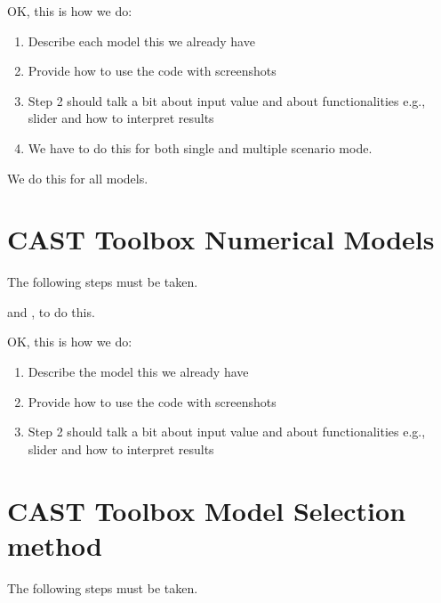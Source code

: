 \documentclass[letterpaper,10pt,english]{sphinxmanual}
\begin{document}
\sphinxAtStartPar
OK, this is how we do:
\begin{enumerate}
%
\item {} 
\sphinxAtStartPar
Describe each model \sphinxhyphen{} this we already have

\item {} 
\sphinxAtStartPar
Provide how to use the code with screenshots

\item {} 
\sphinxAtStartPar
Step 2 should talk a bit about input value and about functionalities \sphinxhyphen{} e.g., slider and how to interpret results

\item {} 
\sphinxAtStartPar
We have to do this for both single and multiple scenario mode.

\end{enumerate}

\sphinxAtStartPar
We do this for all models.


\chapter{CAST Toolbox \sphinxhyphen{} Numerical Models}
\label{\detokenize{contents/toolbox/num_model:cast-toolbox-numerical-models}}\label{\detokenize{contents/toolbox/num_model::doc}}
\sphinxAtStartPar
The following steps must be taken.

\sphinxAtStartPar
{} and , to do this.

\sphinxAtStartPar
OK, this is how we do:
\begin{enumerate}
%
\item {} 
\sphinxAtStartPar
Describe the model \sphinxhyphen{} this we already have

\item {} 
\sphinxAtStartPar
Provide how to use the code with screenshots

\item {} 
\sphinxAtStartPar
Step 2 should talk a bit about input value and about functionalities \sphinxhyphen{} e.g., slider and how to interpret results

\end{enumerate}


\chapter{CAST Toolbox \sphinxhyphen{} Model Selection method}
\label{\detokenize{contents/toolbox/mod_sel:cast-toolbox-model-selection-method}}\label{\detokenize{contents/toolbox/mod_sel::doc}}
\sphinxAtStartPar
The following steps must be taken.
\end{document}
